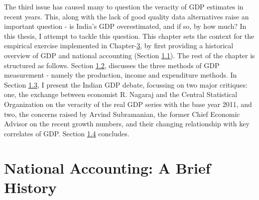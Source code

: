 \documentclass[12pt,nobind, a4paper]{reedthesis}
\begin{document}
 The third issue has caused many to question the veracity of GDP estimates in recent years. This, along with the lack of good quality data alternatives raise an important question - is India's GDP overestimated, and if so, by how much? In this thesis, I attempt to tackle this question. This chapter sets the context for the empirical exercise implemented in Chapter-\protect\hyperlink{ch3}{3}, by first providing a historical overview of GDP and national accounting (Section \protect\hyperlink{his}{1.1}). The rest of the chapter is structured as follows. Section \protect\hyperlink{met}{1.2}, discusses the three methods of GDP measurement - namely the production, income and expenditure methods. In Section \protect\hyperlink{deb}{1.3}, I present the Indian GDP debate, focussing on two major critiques: one, the exchange between economist R. Nagaraj and the Central Statistical Organization on the veracity of the real GDP series with the base year 2011, and two, the concerns raised by Arvind Subramanian, the former Chief Economic Advisor on the recent growth numbers, and their changing relationship with key correlates of GDP. Section \protect\hyperlink{ccn}{1.4} concludes.

 \hypertarget{his}{%
 \section{National Accounting: A Brief History}\label{his}}
\end{document}
